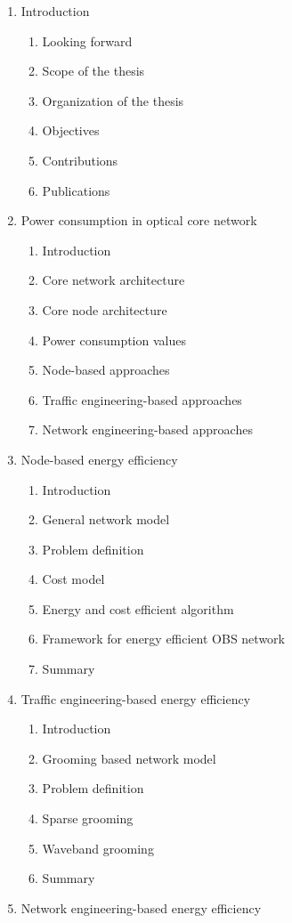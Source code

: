 \documentclass{article}
\begin{document}
\begin{enumerate}
\item Introduction
\begin{enumerate}[i]
\item Looking forward
\item Scope of the thesis
\item Organization of the thesis
\item Objectives
\item Contributions
\item Publications 
\end{enumerate}
\item Power consumption in optical core network
\begin{enumerate}[i]
\item Introduction
\item Core network architecture
\item Core node architecture 
\item Power consumption values
\item Node-based approaches
\item Traffic engineering-based approaches
\item Network engineering-based approaches
\end{enumerate}
\item Node-based energy efficiency
\begin{enumerate}[i]
\item Introduction
\item General network model
\item Problem definition
\item Cost model
\item Energy and cost efficient algorithm
\item Framework for energy efficient OBS network
\item Summary
\end{enumerate}
\item Traffic engineering-based energy efficiency
\begin{enumerate}[i]
\item Introduction
\item Grooming based network model
\item Problem definition
\item Sparse grooming 
\item Waveband grooming 
\item Summary
\end{enumerate}
\item Network engineering-based energy efficiency \begin{enumerate}[i]

\end{enumerate}
\end{enumerate}
\end{document}
